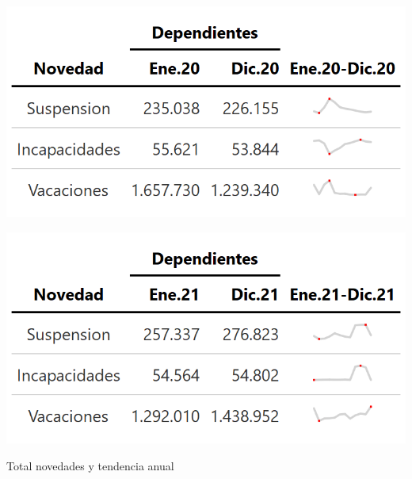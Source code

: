 \begin{table}[!h]
\centering
\begin{minipage}{0.5\textwidth}
  \centering
  \includegraphics[width=\linewidth]{results/01_dinamica/salida_dependientes_novedades_resto_comparativo.png}
\end{minipage}%
\begin{minipage}{0.5\textwidth}
  \centering
  \includegraphics[width=\linewidth]{results/01_dinamica/salida_dependientes_novedades_resto.png}
\end{minipage}
\caption{Total novedades y tendencia anual}
\label{tabla:tabla3}
\end{table}

